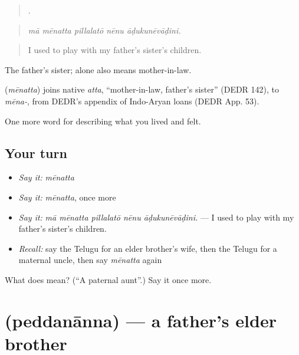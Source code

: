 \begin{quote}
    .
\end{quote}

\begin{quote}
\emph{mā mēnatta pillalatō nēnu āḍukunēvāḍini.}
\end{quote}

\begin{quote}
I used to play with my father's sister's children.
\end{quote}

The father's sister;  alone also means mother-in-law.

\begin{cousinweb}
\textbf{} (\emph{mēnatta}) joins native \emph{atta}, \textquotedblleft{}mother-in-law, father's sister\textquotedblright{} (DEDR 142), to \emph{mēna-}, from DEDR's appendix of Indo-Aryan loans (DEDR App. 53).
\end{cousinweb}

\begin{grammarlens}[title={What you've built}]
One more word for describing what you lived and felt.
\end{grammarlens}

\subsection*{Your turn}
\begin{itemize}
\raggedright
  \item \emph{Say it:} \emph{mēnatta}
  \item \emph{Say it:} \emph{mēnatta}, once more
  \item \emph{Say it:} \emph{mā mēnatta pillalatō nēnu āḍukunēvāḍini.} — I used to play with my father's sister's children.
  \item \emph{Recall:} say the Telugu for an elder brother's wife, then the Telugu for a maternal uncle, then say \emph{mēnatta} again
\end{itemize}

\begin{tcolorbox}[breakable,colback=teal!4,colframe=teal!35!black,title={Before you move on}]
What does  mean? (\textquotedblleft{}A paternal aunt\textquotedblright{}.) Say it once more.
\end{tcolorbox}
\section[\texorpdfstring{\te{పెద్దనాన్న} (peddanānna)}{పెద్దనాన్న (peddanānna)}]{ (peddanānna) — a father's elder brother}

